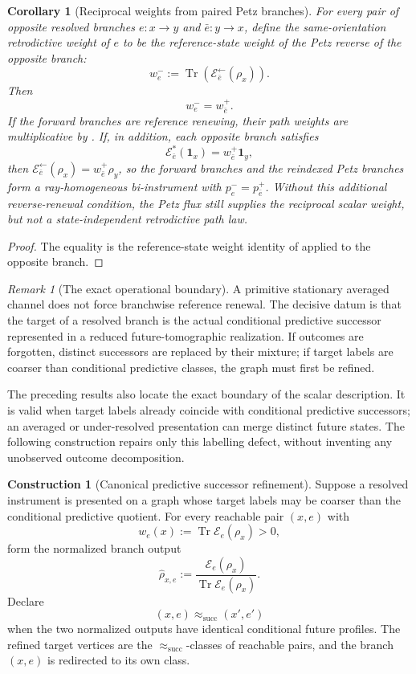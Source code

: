 \documentclass[11pt]{article}
\newtheorem{corollary}[theorem]{Corollary}
\theoremstyle{definition}
\newtheorem{construction}[theorem]{Construction}
\theoremstyle{remark}
\newtheorem{remark}[theorem]{Remark}
\newcommand{\one}{\mathbf 1}
\newcommand{\Tr}{\operatorname{Tr}}
\newcommand{\E}{\mathcal E}
\begin{document}
\begin{corollary}[Reciprocal weights from paired Petz branches]
\label{cor:petz-reciprocal-weights}
For every pair of opposite resolved branches
$e:x\to y$ and $\bar e:y\to x$, define the same-orientation retrodictive weight
of $e$ to be the reference-state weight of the Petz reverse of the opposite
branch:
\[
 w_e^-:=
 \Tr\!\left(\E_{\bar e}^{\leftarrow}(\rho_x)\right).
\]
Then
\[
 \boxed{w_e^-=w_{\bar e}^+.}
\]
If the forward branches are reference renewing, their path weights are
multiplicative by .  If, in addition,
each opposite branch satisfies
\[
 \E_{\bar e}^*(\one_x)=w_{\bar e}^+\one_y,
\]
then
$\E_{\bar e}^{\leftarrow}(\rho_x)=w_{\bar e}^+\rho_y$, so the forward branches
and the reindexed Petz branches form a ray-homogeneous bi-instrument with
$p_e^-=p_{\bar e}^+$.  Without this additional reverse-renewal condition, the
Petz flux still supplies the reciprocal scalar weight, but not a
state-independent retrodictive path law.
\end{corollary}

\begin{proof}
The equality is the reference-state weight identity of
 applied to the opposite branch.
\end{proof}

\begin{remark}[The exact operational boundary]
A primitive stationary averaged channel does not force branchwise reference
renewal.  The decisive datum is that the target of a resolved branch is the
actual conditional predictive successor represented in a reduced
future-tomographic realization.  If outcomes are forgotten, distinct
successors are replaced by their mixture; if target labels are coarser than
conditional predictive classes, the graph must first be refined.
\end{remark}

The preceding results also locate the exact boundary of the scalar description.
It is valid when target labels already coincide with conditional predictive
successors; an averaged or under-resolved presentation can merge distinct future
states.  The following construction repairs only this labelling defect, without
inventing any unobserved outcome decomposition.

\begin{construction}[Canonical predictive successor refinement]
\label{constr:successor-refinement}
Suppose a resolved instrument is presented on a graph whose target labels may be
coarser than the conditional predictive quotient.  For every reachable pair
$(x,e)$ with
\[
 w_e(x):=\Tr\E_e(\rho_x)>0,
\]
form the normalized branch output
\[
 \widehat\rho_{x,e}:=
 \frac{\E_e(\rho_x)}{\Tr\E_e(\rho_x)}.
\]
Declare
\[
 (x,e)\approx_{\mathrm{succ}}(x',e')
\]
when the two normalized outputs have identical conditional future profiles.
The refined target vertices are the $\approx_{\mathrm{succ}}$-classes of
reachable pairs, and the branch $(x,e)$ is redirected to its own class.
\end{construction}
\end{document}
